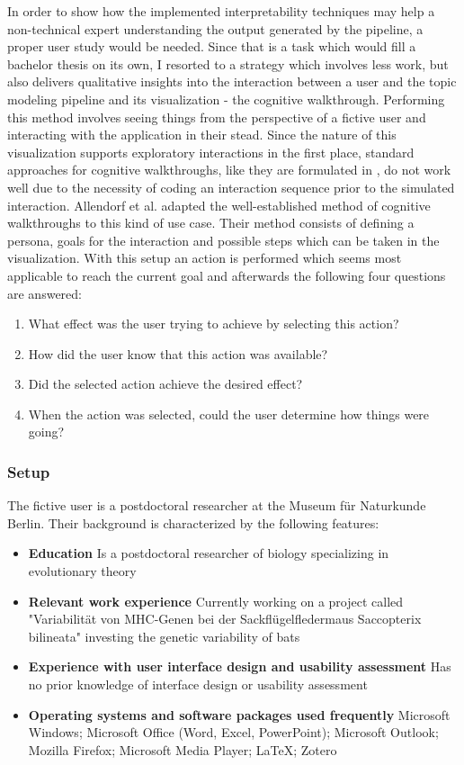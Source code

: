 In order to show how the implemented interpretability techniques may help a non-technical expert understanding the output generated by the pipeline, a proper user study would be needed. Since that is a task which would fill a bachelor thesis on its own, I resorted to a strategy which involves less work, but also delivers qualitative insights into the interaction between a user and the topic modeling pipeline and its visualization - the cognitive walkthrough. Performing this method involves seeing things from the perspective of a fictive user and interacting with the application in their stead.
Since the nature of this visualization supports exploratory interactions in the first place, standard approaches for cognitive walkthroughs, like they are formulated in \cite{whartonUsabilityInspectionMethods1994}, do not work well due to the necessity of coding an interaction sequence prior to the simulated interaction. Allendorf et al. \cite{allendoerferAdaptingCognitiveWalkthrough2005} adapted the well-established method of cognitive walkthroughs to this kind of use case. Their method consists of defining a persona, goals for the interaction and possible steps which can be taken in the visualization. With this setup an action is performed which seems most applicable to reach the current goal and afterwards the following four questions are answered:
\begin{enumerate}
	\item What effect was the user trying to achieve by selecting this action?
	\item How did the user know that this action was available?
	\item Did the selected action achieve the desired effect?
	\item When the action was selected, could the user determine how things were going?
\end{enumerate}

\subsubsection{Setup}
The fictive user is a postdoctoral researcher at the Museum für Naturkunde Berlin. Their background is characterized by the following features:
\begin{itemize}
	\item \textbf{Education}
	Is a postdoctoral researcher of biology specializing in evolutionary theory
	
	\item \textbf{Relevant work experience}
	Currently working on a project called "Variabilität von MHC-Genen bei der Sackflügelfledermaus Saccopterix bilineata" investing the genetic variability of bats
	
	\item \textbf{Experience with user interface design and usability assessment}
	Has no prior knowledge of interface design or usability assessment
	
	\item \textbf{Operating systems and software packages used frequently}
	Microsoft Windows; Microsoft Office (Word, Excel, PowerPoint); Microsoft Outlook; Mozilla Firefox; Microsoft Media Player; LaTeX; Zotero
\end{itemize}

